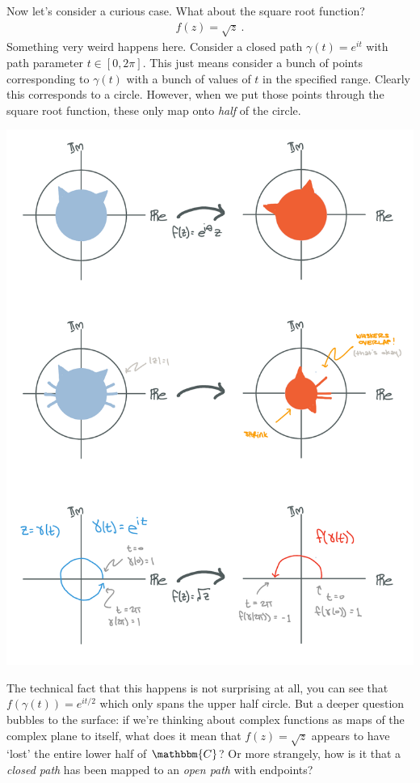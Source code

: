 Now let's consider a curious case. What about the square root function?
\begin{align}
  f(z) = \sqrt{z} \ .
\end{align}
Something very weird happens here. Consider a closed path $\gamma(t) = e^{it}$ with path parameter $t \in [0,2\pi]$. This just means consider a bunch of points corresponding to $\gamma(t)$ with a bunch of values of $t$ in the specified range. Clearly this corresponds to a circle. However, when we put those points through the square root function, these only map onto \emph{half} of the circle. 
\begin{center}
\includegraphics[width=.7\textwidth]{figures/Complex_04_log.pdf}
\end{center}
The technical fact that this happens is not surprising at all, you can see that $f(\gamma(t)) = e^{it/2}$ which only spans the upper half circle. But a deeper question bubbles to the surface: if we're thinking about complex functions as maps of the complex plane to itself, what does it mean that $f(z) = \sqrt{z}$ appears to have `lost' the entire lower half of $\mathbbm{C}$? Or more strangely, how is it that a \emph{closed path} has been mapped to an \emph{open path} with endpoints?

